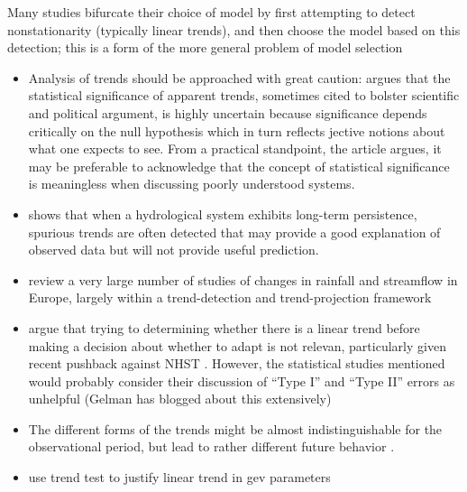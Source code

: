 \documentclass[11pt]{article}
\begin{document}
Many studies bifurcate their choice of model by first attempting to detect nonstationarity (typically linear trends), and then choose the model based on this detection; this is a form of the more general problem of model selection
\begin{itemize}
  \item Analysis of trends should be approached with great caution: \citet{Cohn2005} argues that the statistical significance of apparent trends, sometimes cited to bolster scientific and political argument, is highly uncertain because significance depends critically on the null hypothesis which in turn reflects jective notions about what one expects to see. From a practical standpoint, the article argues, it may be preferable to acknowledge that the concept of statistical significance is meaningless when discussing poorly understood systems.
  \item \citet{Cohn2005} shows that when a hydrological system exhibits long-term persistence, spurious trends are often detected that may provide a good explanation of observed data but will not provide useful prediction.
  \item \citet{Madsen2014a} review a very large number of studies of changes in rainfall and streamflow in Europe, largely within a trend-detection and trend-projection framework
  \item \citet{Vogel2013,Rosner2014} argue that trying to determining whether there is a linear trend before making a decision about whether to adapt is not relevan, particularly given recent pushback against NHST \citep[\ie][]{Gelman2016,Gelman2014a}. However, the statistical studies mentioned would probably consider their discussion of ``Type I'' and ``Type II'' errors as unhelpful (Gelman has blogged about this extensively)
  \item  The different forms of the trends might be almost indistinguishable for the observational period, but lead to rather different future behavior \citep{Rootzen2013}.
  \item \citet{Qi2017} use trend test to justify linear trend in {gev} parameters
\end{itemize}
\end{document}
